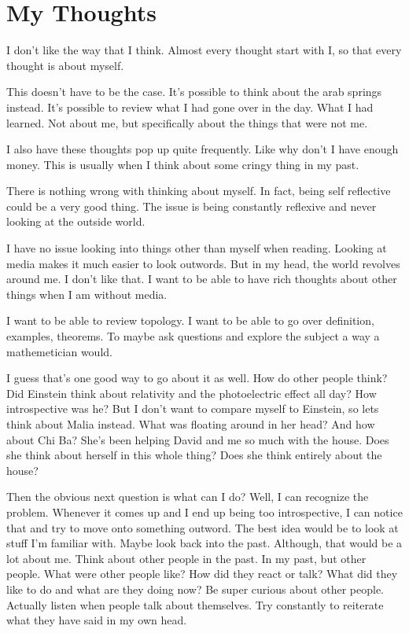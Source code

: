 \documentclass{article}
\title{}
\author{Long Nguyen}
\date{November 2023}
\begin{document}
\maketitle

\section{My Thoughts}
I don't like the way that I think. Almost every thought start with I, so that every thought is about myself.

This doesn't have to be the case. It's possible to think about the arab springs instead. It's possible to review what I had gone over in the day. What I had learned. Not about me, but specifically about the things that were not me.

I also have these thoughts pop up quite frequently. Like why don't I have enough money. This is usually when I think about some cringy thing in my past.

There is nothing wrong with thinking about myself. In fact, being self reflective could be a very good thing. The issue is being constantly reflexive and never looking at the outside world.

I have no issue looking into things other than myself when reading. Looking at media makes it much easier to look outwords. But in my head, the world revolves around me. I don't like that. I want to be able to have rich thoughts about other things when I am without media.

I want to be able to review topology. I want to be able to go over definition, examples, theorems. To maybe ask questions and explore the subject a way a mathemetician would.

I guess that's one good way to go about it as well. How do other people think? Did Einstein think about relativity and the photoelectric effect all day? How introspective was he? But I don't want to compare myself to Einstein, so lets think about Malia instead. What was floating around in her head? And how about Chi Ba? She's been helping David and me so much with the house. Does she think about herself in this whole thing? Does she think entirely about the house?

Then the obvious next question is what can I do? Well, I can recognize the problem. Whenever it comes up and I end up being too introspective, I can notice that and try to move onto something outword. The best idea would be to look at stuff I'm familiar with. Maybe look back into the past. Although, that would be a lot about me. Think about other people in the past. In my past, but other people. What were other people like? How did they react or talk? What did they like to do and what are they doing now? Be super curious about other people. Actually listen when people talk about themselves. Try constantly to reiterate what they have said in my own head.
\end{document}
